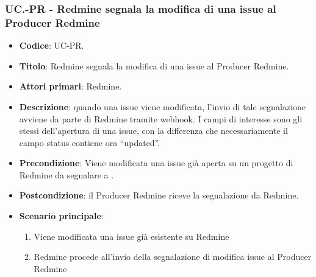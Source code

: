 
\subsubsection{UC\theuccount.\thesubuccount-PR - Redmine segnala la modifica di una issue al Producer Redmine}
\begin{itemize}
	\item \textbf{Codice}: UC\theuccount-PR.
	\item \textbf{Titolo}: Redmine segnala la modifica di una issue al Producer Redmine.
	\item \textbf{Attori primari}: Redmine.
	\item \textbf{Descrizione}: quando una issue viene modificata, l'invio di tale segnalazione
	avviene da parte di Redmine tramite webhook.
	I campi di interesse sono gli stessi dell'apertura di una issue, con la differenza che necessariamente il campo status contiene ora ``updated''.
	\item \textbf{Precondizione}: Viene modificata una issue già aperta su un
	progetto di Redmine da segnalare a \progetto.
	\item \textbf{Postcondizione}: il Producer Redmine riceve la segnalazione da Redmine.
	\item \textbf{Scenario principale}: 
	\begin{enumerate}
		\item Viene modificata una issue già esistente su Redmine
		\item Redmine procede all'invio della segnalazione di modifica issue al Producer Redmine
	\end{enumerate}
	
\end{itemize}


